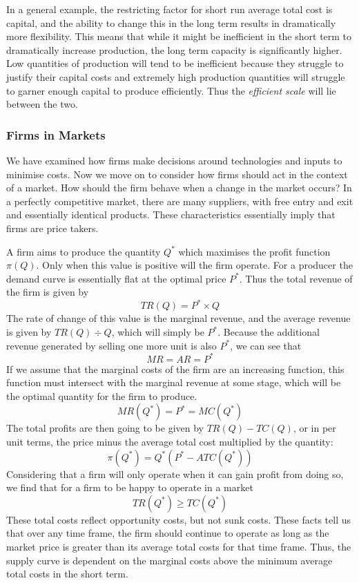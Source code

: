 \documentclass[12pt]{report}
\begin{document}
\begin{flushleft}
\bigskip
In a general example, the restricting factor for short run average total cost
is capital, and the ability to change this in the long term results in 
dramatically more flexibility. This means that while it might be inefficient
in the short term to dramatically increase production, the long term capacity
is significantly higher. Low quantities of production will tend to be 
inefficient because they struggle to justify their capital costs and extremely
high production quantities will struggle to garner enough capital to produce
efficiently. Thus the \textit{efficient scale} will lie between the two.

\subsubsection*{Firms in Markets}
We have examined how firms make decisions around technologies and inputs to 
minimise costs. Now we move on to consider how firms should act in the context
of a market. How should the firm behave when a change in the market occurs? In 
a perfectly competitive market, there are many suppliers, with free entry and 
exit and essentially identical products. These characteristics essentially 
imply that firms are price takers. 

\bigskip
A firm aims to produce the quantity \(Q^*\) which maximises the profit function
\(\pi(Q)\). Only when this value is positive will the firm operate. For a 
producer the demand curve is essentially flat at the optimal price \(P^*\). 
Thus the total revenue of the firm is given by
\[TR(Q) = P^* \times Q\]
The rate of change of this value is the marginal revenue, and the average
revenue is given by \(TR(Q) \div Q\), which will simply be \(P^*\). Because
the additional revenue generated by selling one more unit is also \(P^*\),
we can see that
\[MR = AR = P^*\]
If we assume that the marginal costs of the firm are an increasing function,
this function must intersect with the marginal revenue at some stage, which
will be the optimal quantity for the firm to produce.
\[MR(Q^*) = P^* = MC(Q^*)\]
The total profits are then going to be given by \(TR(Q) - TC(Q)\), or in per
unit terms, the price minus the average total cost multiplied by the quantity:
\[\pi(Q^*) = Q^*(P^* - ATC(Q^*))\]
Considering that a firm will only operate when it can gain profit from doing
so, we find that for a firm to be happy to operate in a market
\[TR(Q^*) \geq TC(Q^*)\]
These total costs reflect opportunity costs, but not sunk costs. These facts
tell us that over any time frame, the firm should continue to operate as long
as the market price is greater than its average total costs for that time 
frame. Thus, the supply curve is dependent on the marginal costs above the 
minimum average total costs in the short term.


\end{flushleft}
\end{document}
